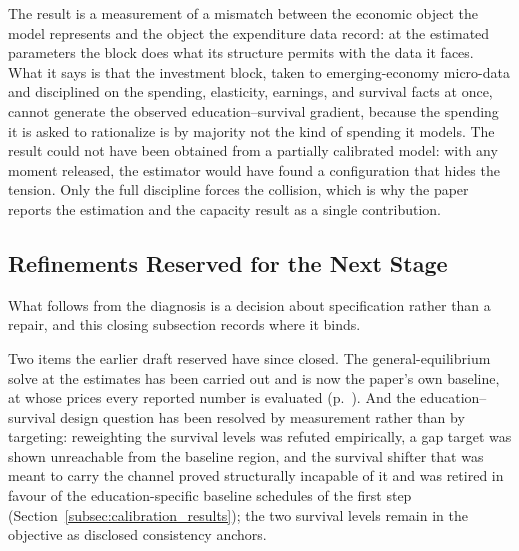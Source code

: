 \documentclass[12pt,a4paper]{article}
\begin{document}
The result is a measurement of a mismatch between the economic object the model represents and the object the expenditure data record: at the estimated parameters the block does what its structure permits with the data it faces. What it says is that the investment block, taken to emerging-economy micro-data and disciplined on the spending, elasticity, earnings, and survival facts at once, cannot generate the observed education--survival gradient, because the spending it is asked to rationalize is by majority not the kind of spending it models. The result could not have been obtained from a partially calibrated model: with any moment released, the estimator would have found a configuration that hides the tension. Only the full discipline forces the collision, which is why the paper reports the estimation and the capacity result as a single contribution.

\subsection{Refinements Reserved for the Next Stage}
\label{subsec:roadmap}

What follows from the diagnosis is a decision about specification rather than a repair, and this closing subsection records where it binds.

Two items the earlier draft reserved have since closed. The general-equilibrium solve at the estimates has been carried out and is now the paper's own baseline, at whose prices every reported number is evaluated (p.~\pageref{par:superseded}). And the education--survival design question has been resolved by measurement rather than by targeting: reweighting the survival levels was refuted empirically, a gap target was shown unreachable from the baseline region, and the survival shifter that was meant to carry the channel proved structurally incapable of it and was retired in favour of the education-specific baseline schedules of the first step (Section~\ref{subsec:calibration_results}); the two survival levels remain in the objective as disclosed consistency anchors.
\end{document}
